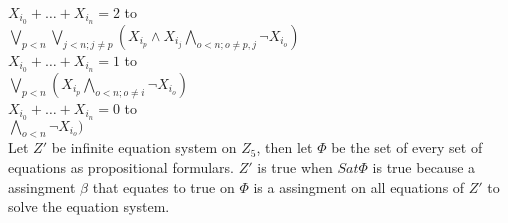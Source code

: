 $X_{i_0} + \ldots + X_{i_n} = 2$ to \\
$\bigvee_{p<n} \bigvee_{j<n;  j\neq p}  (X_{i_p} \wedge X_{i_j} \bigwedge_{o<n;  o\neq p,j} \neg X_{i_o} )$\\

$X_{i_0} + \ldots + X_{i_n} =1$ to \\
$\bigvee_{p<n} (X_{i_p} \bigwedge_{o<n;  o\neq i} \neg X_{i_o} )$\\

$X_{i_0} + \ldots + X_{i_n} = 0$ to \\
$ \bigwedge_{o<n} \neg X_{i_o} )$\\

Let $Z'$ be infinite equation system on $Z_5$, then let $\Phi$ be the set of every set of equations as propositional formulars. $Z'$ is true when $Sat\Phi$ is true because a assingment $\beta$ that equates to true on $\Phi$ is a assingment on all equations of $Z'$ to solve the equation system.
